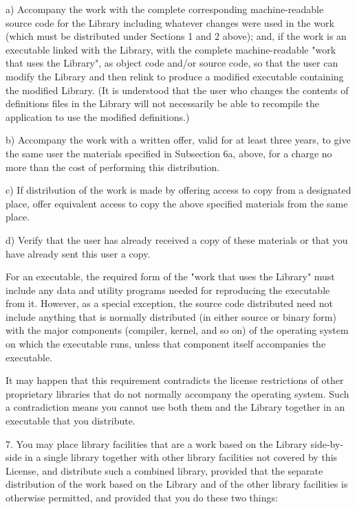 \documentclass[twoside]{tceusermanual}
\begin{document}
    a) Accompany the work with the complete corresponding
    machine-readable source code for the Library including whatever
    changes were used in the work (which must be distributed under
    Sections 1 and 2 above); and, if the work is an executable linked
    with the Library, with the complete machine-readable "work that
    uses the Library", as object code and/or source code, so that the
    user can modify the Library and then relink to produce a modified
    executable containing the modified Library.  (It is understood
    that the user who changes the contents of definitions files in the
    Library will not necessarily be able to recompile the application
    to use the modified definitions.)

    b) Accompany the work with a written offer, valid for at
    least three years, to give the same user the materials
    specified in Subsection 6a, above, for a charge no more
    than the cost of performing this distribution.

    c) If distribution of the work is made by offering access to copy
    from a designated place, offer equivalent access to copy the above
    specified materials from the same place.

    d) Verify that the user has already received a copy of these
    materials or that you have already sent this user a copy.

For an executable, the required form of the "work that uses the
Library" must include any data and utility programs needed for
reproducing the executable from it.  However, as a special
exception, the source code distributed need not include anything
that is normally distributed (in either source or binary form)
with the major components (compiler, kernel, and so on) of the
operating system on which the executable runs, unless that
component itself accompanies the executable.

It may happen that this requirement contradicts the license
restrictions of other proprietary libraries that do not normally
accompany the operating system.  Such a contradiction means you
cannot use both them and the Library together in an executable
that you distribute.
 
7. You may place library facilities that are a work based on the
Library side-by-side in a single library together with other
library facilities not covered by this License, and distribute
such a combined library, provided that the separate distribution
of the work based on the Library and of the other library
facilities is otherwise permitted, and provided that you do
these two things:
\end{document}
